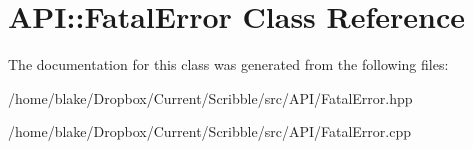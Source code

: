 \hypertarget{class_a_p_i_1_1_fatal_error}{\section{A\-P\-I\-:\-:Fatal\-Error Class Reference}
\label{class_a_p_i_1_1_fatal_error}
}


The documentation for this class was generated from the following files\-:\begin{DoxyCompactItemize}
\item 
/home/blake/\-Dropbox/\-Current/\-Scribble/src/\-A\-P\-I/Fatal\-Error.\-hpp\item 
/home/blake/\-Dropbox/\-Current/\-Scribble/src/\-A\-P\-I/Fatal\-Error.\-cpp\end{DoxyCompactItemize}
